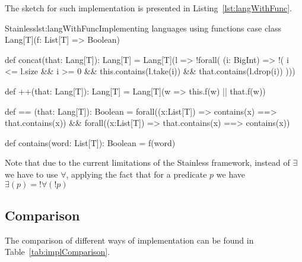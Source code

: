 The sketch for such implementation is presented in Listing~\ref{lst:langWithFunc}.

\begin{Code}{Stainless}{lst:langWithFunc}{Implementing languages using functions}
case class Lang[T](f: List[T] => Boolean) {
	
  def concat(that: Lang[T]): Lang[T] = {
    Lang[T](l => !forall( (i: BigInt) => !(
      i <= l.size &&
      i >= 0 &&
      this.contains(l.take(i)) &&
      that.contains(l.drop(i))
    )))
  }
  
  def ++(that: Lang[T]): Lang[T] = {
    Lang[T](w => this.f(w) || that.f(w))
  }

  def == (that: Lang[T]): Boolean = {
    forall((x:List[T]) => contains(x) ==> that.contains(x)) &&
    forall((x:List[T]) => that.contains(x) ==> contains(x))
  }

  def contains(word: List[T]): Boolean = f(word)
}
\end{Code}



Note that due to the current limitations of the Stainless framework, instead of $\exists$ we have to use $\forall$, applying the fact that for a predicate $p$ we have $\exists(p) = ! \forall(!p)$

\subsection{Comparison}
\label{sect:impl.comp}
The comparison of different ways of implementation can be found in Table~\ref{tab:implComparison}.

